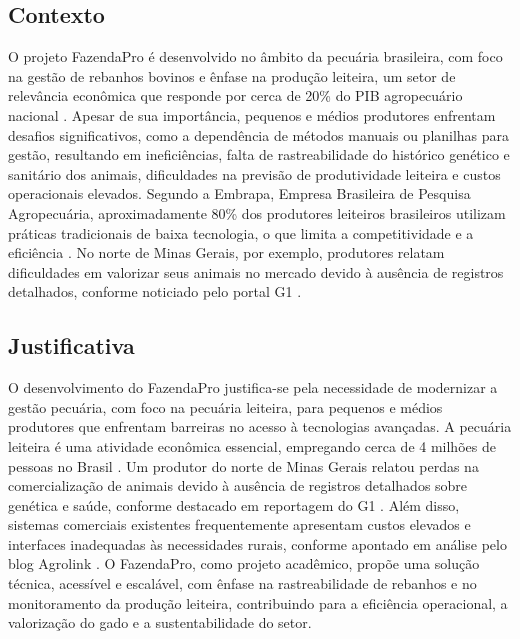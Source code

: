 \documentclass[12pt, a4paper]{article}
\begin{document}
\subsection{Contexto}
\begin{spacing}{1.5}
O projeto FazendaPro é desenvolvido no âmbito da pecuária brasileira, com foco na gestão de rebanhos bovinos e ênfase na produção leiteira, um setor de relevância econômica que responde por cerca de 20\% do PIB agropecuário nacional \cite{agro20}. Apesar de sua importância, pequenos e médios produtores enfrentam desafios significativos, como a dependência de métodos manuais ou planilhas para gestão, resultando em ineficiências, falta de rastreabilidade do histórico genético e sanitário dos animais, dificuldades na previsão de produtividade leiteira e custos operacionais elevados. Segundo a Embrapa, Empresa Brasileira de Pesquisa Agropecuária,  aproximadamente 80\% dos produtores leiteiros brasileiros utilizam práticas tradicionais de baixa tecnologia, o que limita a competitividade e a eficiência \cite{anuario2023}. No norte de Minas Gerais, por exemplo, produtores relatam dificuldades em valorizar seus animais no mercado devido à ausência de registros detalhados, conforme noticiado pelo portal G1 \cite{g12022}.
\end{spacing}

\subsection{Justificativa}
\begin{spacing}{1.5}
O desenvolvimento do FazendaPro justifica-se pela necessidade de modernizar a gestão pecuária, com foco na pecuária leiteira, para pequenos e médios produtores que enfrentam barreiras no acesso à tecnologias avançadas. A pecuária leiteira é uma atividade econômica essencial, empregando cerca de 4 milhões de pessoas no Brasil \cite{4milhao}. Um produtor do norte de Minas Gerais relatou perdas na comercialização de animais devido à ausência de registros detalhados sobre genética e saúde, conforme destacado em reportagem do G1 \cite{g12022}. Além disso, sistemas comerciais existentes frequentemente apresentam custos elevados e interfaces inadequadas às necessidades rurais, conforme apontado em análise pelo blog Agrolink \cite{agropec2024}. O FazendaPro, como projeto acadêmico, propõe uma solução técnica, acessível e escalável, com ênfase na rastreabilidade de rebanhos e no monitoramento da produção leiteira, contribuindo para a eficiência operacional, a valorização do gado e a sustentabilidade do setor.
\end{spacing}
\end{document}
